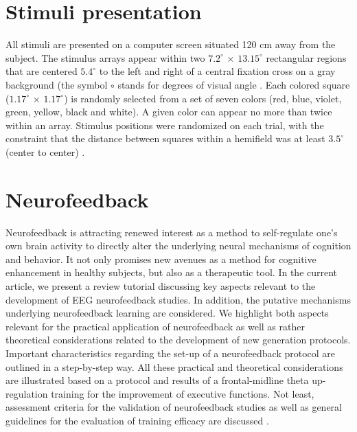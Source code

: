 


\section{Stimuli presentation}
All stimuli are presented on a computer screen situated 120 cm away from the subject. The stimulus arrays appear within two $7.2^{\circ}$ × $13.15^{\circ}$ rectangular regions that are centered $5.4^{\circ}$ to the left and right of a central fixation cross on a gray background (the symbol $\circ$ stands for degrees of visual angle \cite{newsome1972visual, haeuslschmid2017recognition}. Each colored square ($1.17^{\circ}$ × $1.17^{\circ}$) is randomly selected from a set of seven colors (red, blue, violet, green, yellow, black and white). A given color can appear no more than twice within an array. Stimulus positions were randomized  on each trial, with the constraint that the distance between squares within a hemifield was at least $3.5^{\circ}$ (center to center) \cite{villena2020data}.




\section{Neurofeedback} \label{appendix:neurofeedback}

Neurofeedback is attracting renewed interest as a method to self-regulate one’s own brain activity to directly alter the underlying neural mechanisms of cognition and behavior. It not only promises new avenues as a method for cognitive enhancement in healthy subjects, but also as a therapeutic tool. In the current article, we present a review tutorial discussing key aspects relevant to the development of EEG neurofeedback studies. In addition, the putative mechanisms underlying neurofeedback learning are considered. We highlight both aspects relevant for the practical application of neurofeedback as well as rather theoretical considerations related to the development of new generation protocols. Important characteristics regarding the set-up of a neurofeedback protocol are outlined in a step-by-step way. All these practical and theoretical considerations are illustrated based on a protocol and results of a frontal-midline theta up-regulation training for the improvement of executive functions. Not least, assessment criteria for the validation of neurofeedback studies as well as general guidelines for the evaluation of training efficacy are discussed \cite{enriquez2017eeg}.

